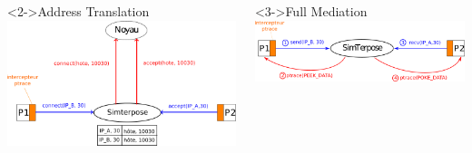 \documentclass[10.5pt]{beamer}
\begin{document}
\begin{frame}{\subsecname}
\begin{columns}[c]
  \begin{column}{5cm}
    \begin{block}<2->{Address Translation}
      \centering
      \includegraphics[scale=0.4]{Pictures/png/Mediation_translation_v2_pres}
    \end{block}
  \end{column}
  \begin{column}{5cm}
    \begin{block}<3->{Full Mediation}
      \centering
      \includegraphics[scale=0.4]{Pictures/png/Mediation_full_v1_pres}
    \end{block}
  \end{column}
\end{columns}
\end{frame}
\end{document}
